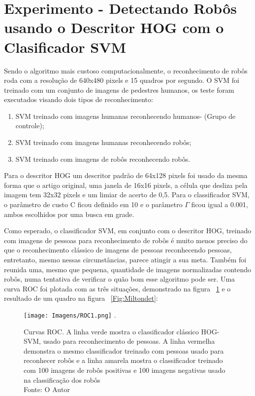 \section{Experimento - Detectando Robôs usando o Descritor HOG com o Clasificador SVM}
\label{HOG-SVM}

Sendo o algoritmo mais custoso computacionalmente, o reconhecimento de robôs roda com a resolução de 640x480 pixels e 15 quadros por segundo. O SVM foi treinado com um conjunto de imagens de pedestres humanos, os teste foram executados visando dois tipos de reconhecimento:
\begin{enumerate}
	\item SVM treinado com imagens humanas reconhecendo humanos- (Grupo de controle);
	\item SVM treinado com imagens humanas reconhecendo robôs;
	\item SVM treinado com imagens de robôs reconhecendo robôs.
\end{enumerate}


Para o descritor HOG um descritor padrão de 64x128 pixels foi usado da mesma forma que o artigo original, uma janela de 16x16 pixels, a célula que desliza pela imagem tem 32x32 pixels e um limiar de acerto de 0,5. Para o classificador SVM, o parâmetro de custo C ficou definido em 10 e o parâmetro $\Gamma$ ficou igual a 0.001, ambos escolhidos por uma busca em grade.

Como esperado, o classificador SVM, em conjunto com o descritor HOG, treinado com imagens de pessoas para reconhecimento de robôs é muito menos preciso do que o reconhecimento clássico de imagens de pessoas reconhecendo pessoas, entretanto, mesmo nessas circunstâncias, parece atingir a sua meta. Também foi reunida uma, mesmo que pequena, quantidade de imagens normalizadas contendo robôs, numa tentativa de verificar o quão bom esse algoritmo pode ser. Uma curva ROC foi plotada com as três situações, demonstrado na figura ~\ref{Fig:ROC} e o resultado de um quadro na figura ~\ref{Fig:Miltondet}:

\begin{figure}[!hH]
\centering
\texttt{[image: Imagens/ROC1.png]}
\DeclareGraphicsExtensions.
\caption{Curvas ROC. A linha verde mostra o classificador clássico HOG-SVM, usado para reconhecimento de pessoas.
A linha vermelha demonstra o mesmo classificador treinado com pessoas usado para reconhecer robôs e a linha amarela mostra o classificador treinado com 100 imagens de robôs positivas e 100 imagens negativas usado na classificação dos robôs \\ Fonte: O Autor}
\label{Fig:ROC}
\end{figure}

